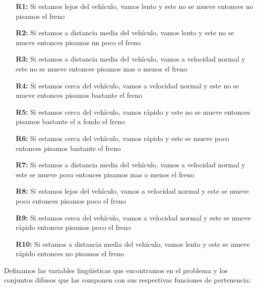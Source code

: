 \documentclass[a4paper,10pt,twocolumn]{article}
\begin{document}
\begin{enumerate}
	\item[\textbf{R1:}] Si estamos lejos del veh\'iculo, vamos lento y este no se mueve entonces no pisamos el freno 
	
	\item[\textbf{R2:}] Si estamos a distancia media del veh\'iculo, vamos lento y este no se mueve entonces pisamos un poco el freno
	
	\item[\textbf{R3:}] Si estamos a distancia media del veh\'iculo, vamos a velocidad normal y este no se mueve entonces pisamos mas o menos el freno
	
	\item[\textbf{R4:}] Si estamos cerca del veh\'iculo, vamos a velocidad normal y este no se mueve entonces pisamos bastante el freno
	
	\item[\textbf{R5:}] Si estamos cerca del veh\'iculo, vamos r\'apido y este no se mueve entonces pisamos bastante el a fondo el freno
	
	\item[\textbf{R6:}] Si estamos cerca del veh\'iculo, vamos r\'apido y este se mueve poco entonces pisamos bastante el freno
	
	\item[\textbf{R7:}] Si estamos a distancia media del veh\'iculo, vamos a velocidad normal y este se mueve poco entonces pisamos mas o menos el freno
	
	\item[\textbf{R8:}] Si estamos lejos del veh\'iculo, vamos a velocidad normal y este se mueve poco entonces pisamos poco el freno
		
	\item[\textbf{R9:}] Si estamos cerca del veh\'iculo, vamos a velocidad normal y este se mueve r\'apido entonces pisamos poco el freno
	
	\item[\textbf{R10:}] Si estamos a distancia media del veh\'iculo, vamos lento y este se mueve r\'apido entonces no pisamos el freno
\end{enumerate}

Definamos las variables ling\"uisticas que encontramos en el problema y los conjuntos difusos que las componen con sus respectivas funciones de pertenencia:
\end{document}
